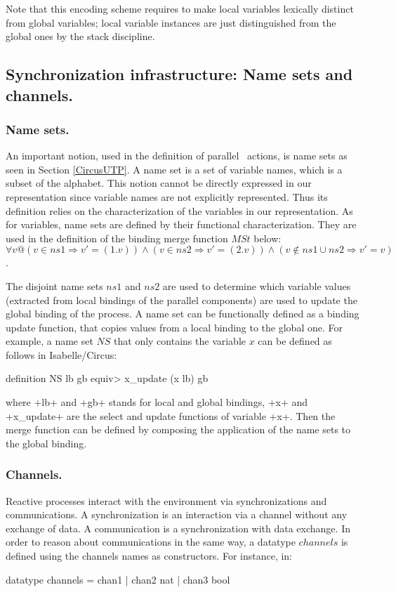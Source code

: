 \documentclass[11pt,a4paper]{article}
\begin{document}
Note that this encoding scheme requires to make local variables lexically distinct from global variables; local
variable instances are just distinguished from the global ones by the stack discipline. 

\subsection{Synchronization infrastructure: Name sets and channels.}
\label{Section:NSandCS}
\subsubsection{Name sets.}
An important notion, used in the definition of parallel \Circus\ actions, is name sets
as seen in Section \ref{CircusUTP}. A name set is a set of variable names, which is a subset of 
the alphabet. This notion cannot be directly expressed in our representation since variable names are not explicitly represented. %
Thus its definition relies on the characterization of the variables in our representation. As for variables, name sets are defined by their functional 
characterization. They are used in the definition of the binding merge function $MSt$ below:\\
{\footnotesize $\forall v @ (v \in ns1 \Rightarrow v' = (1.v)) \land (v \in ns2 \Rightarrow v' = (2.v)) \land (v \notin ns1 \cup ns2 \Rightarrow v' = v)$}.

The disjoint name sets $ns1$ and $ns2$ are used to determine which variable values (extracted from local bindings of the parallel components) 
are used to update the global binding of the process. %
A name set can be functionally defined as a binding update function, that 
copies values from a local binding to the global one. For example, a name set $NS$ that only contains the variable $x$ can be defined as follows in Isabelle/Circus:
\begin{isar}
definition NS lb gb \<equiv>    x_update (x lb) gb
\end{isar}

\noindent where  \inlineisar+lb+ and \inlineisar+gb+ stands for local and global bindings, \inlineisar+x+ and \inlineisar+x_update+ are the select and update functions of variable \inlineisar+x+. 
Then the merge function can be defined by composing the application of the name sets to the global binding.

\subsubsection{Channels.}
Reactive processes interact with the environment via synchronizations and communications. A synchronization is an interaction via a channel 
without any exchange of data. A communication is a synchronization with data exchange. In order to reason about communications in the same way, 
a datatype $channels$ is defined using the channels names as constructors.
For instance, in:
\begin{isar}
datatype channels = chan1 | chan2 nat | chan3 bool
\end{isar}
\end{document}
